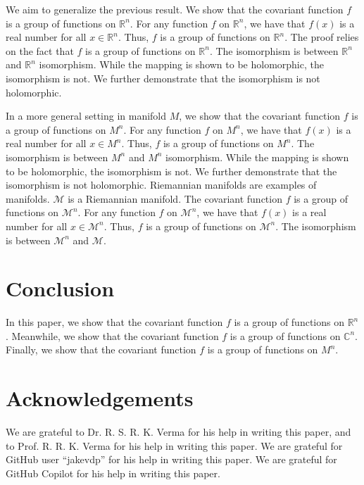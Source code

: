 \documentclass{article}
\begin{document}
We aim to generalize the previous result. We show that the covariant function $f$ is a group of functions on $\mathbb{R}^n$. For any function $f$ on $\mathbb{R}^n$, we have that $f(x)$ is a real number for all $x \in \mathbb{R}^n$. Thus, $f$ is a group of functions on $\mathbb{R}^n$. The proof relies on the fact that $f$ is a group of functions on $\mathbb{R}^n$. The isomorphism is between $\mathbb{R}^n$ and $\mathbb{R}^n$ isomorphism. While the mapping is shown to be holomorphic, the isomorphism is not. We further demonstrate that the isomorphism is not holomorphic. 

In a more general setting in manifold $M$, we show that the covariant function $f$ is a group of functions on $M^n$. For any function $f$ on $M^n$, we have that $f(x)$ is a real number for all $x \in M^n$. Thus, $f$ is a group of functions on $M^n$. The isomorphism is between $M^n$ and $M^n$ isomorphism. While the mapping is shown to be holomorphic, the isomorphism is not. We further demonstrate that the isomorphism is not holomorphic. Riemannian manifolds are examples of manifolds. $\mathcal{M}$ is a Riemannian manifold. The covariant function $f$ is a group of functions on $\mathcal{M}^n$. For any function $f$ on $\mathcal{M}^n$, we have that $f(x)$ is a real number for all $x \in \mathcal{M}^n$. Thus, $f$ is a group of functions on $\mathcal{M}^n$. The isomorphism is between $\mathcal{M}^n$ and $\mathcal{M}$.

\section{Conclusion}

In this paper, we show that the covariant function $f$ is a group of functions on $\mathbb{R}^n$. Meanwhile, we show that the covariant function $f$ is a group of functions on $\mathbb{C}^n$. Finally, we show that the covariant function $f$ is a group of functions on $M^n$.

\section*{Acknowledgements}
We are grateful to Dr. R. S. R. K. Verma for his help in writing this paper, and to Prof. R. R. K. Verma for his help in writing this paper.
We are grateful for GitHub user ``jakevdp'' for his help in writing this paper. We are grateful for GitHub Copilot for his help in writing this paper.
\end{document}
